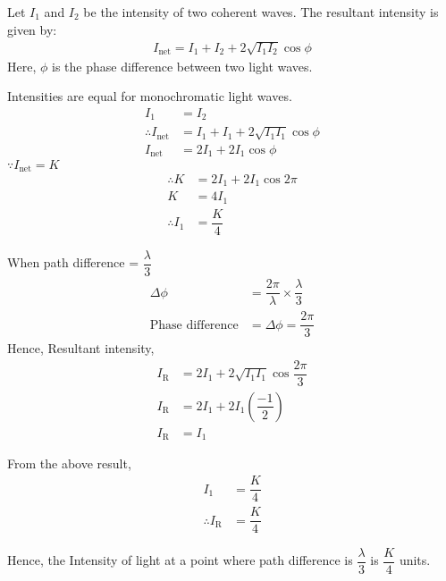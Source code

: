 \documentclass[journal,12pt,twocolumn]{IEEEtran}
\theoremstyle{remark}
\begin{document}
Let $I_1$ and $I_2$ be the intensity of two coherent waves. The resultant intensity is given by:
\begin{align}
    I_{\text{net}} = I_1 + I_2 + 2\sqrt{I_1I_2}\cos{\phi}
\end{align}
Here, $\phi$ is the phase difference between two light waves.

Intensities are equal for monochromatic light waves.
\begin{align}
   I_1 &= I_2 \\
\therefore I_{\text{net}} &= I_1 + I_1 + 2\sqrt{I_1I_1}\cos{\phi} \nonumber \\ 
        I_{\text{net}} &= 2I_1 + 2I_1\cos{\phi}
\end{align}
$\because I_{\text{net}} = K$
\begin{align}
   \therefore K &= 2I_1 +2I_1\cos{2\pi} \nonumber \\
    K &= 4I_1 \nonumber \\
 \therefore    I_1&=\dfrac{K}{4} 
\end{align}

When path difference = $\dfrac{\lambda}{3}$ \\
\begin{align}
\Delta \phi &= \dfrac{2\pi}{\lambda}  \times  \dfrac{\lambda}{3} \nonumber \\
\text{Phase difference} &=  \Delta \phi = \dfrac{2\pi}{3}
\end{align}
Hence,
\hspace*{0.5cm}Resultant intensity,
\begin{align}
I_{\text{R}} &= 2I_1 + 2\sqrt{I_1I_1}\cos{\dfrac{2\pi}{3}} \nonumber  \\
I_{\text{R}} &= 2I_1 + 2I_1\left(\dfrac{-1}{2}\right)\nonumber \\
I_{\text{R}} &= I_1
\end{align}

From the above result,
\hspace*{0.5cm}
\begin{align}
I_1 &= \dfrac{K}{4} \nonumber \\
\therefore I_{\text{R}} &= \dfrac{K}{4} 
\end{align}

Hence, the Intensity of light at a point where path difference is $\dfrac{\lambda}{3}$ is $\dfrac{K}{4}$ units.


\end{document}
